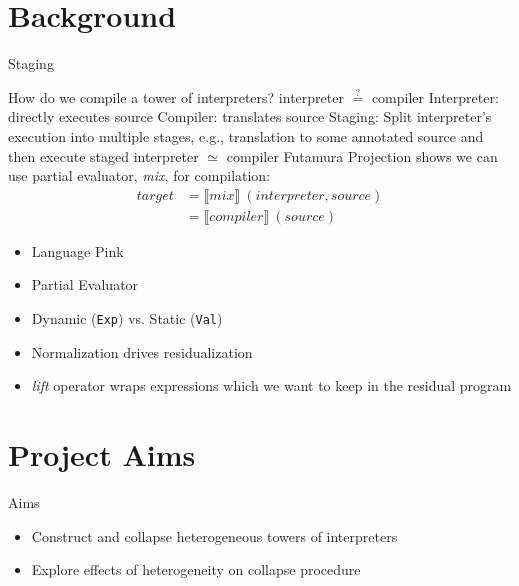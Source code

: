 \documentclass{beamer}
\begin{document}
\section{Background}
\begin{frame}{Staging}
    \begin{outline}
        \1 How do we compile a tower of interpreters?
        \pause
        \1 interpreter $\stackrel{?}=$ compiler
        \pause
        \1 Interpreter: directly executes source
        \1 Compiler: translates source
        \pause
        \1 Staging: Split interpreter's execution into multiple stages, e.g., translation to some annotated source and then execute
        \pause
        \1 staged interpreter $\simeq$ compiler
        \pause
        \1  Futamura Projection \cite{futamura1999partial} shows we can use partial evaluator, \textit{mix}, for compilation:
                \begin{align*}
                    \mathit{target} & = \llbracket \mathit{mix} \rrbracket \: (\mathit{interpreter, source}) \\
                                    & = \llbracket \mathit{compiler} \rrbracket \: (\mathit{source})
                \end{align*}
    \end{outline}
\end{frame}

\begin{frame}{\texorpdfstring{\mslang}{}}
    \begin{itemize}
        \item Language Pink \cite{amin2017collapsing}
        \item Partial Evaluator
        \item Dynamic (\texttt{Exp}) vs. Static (\texttt{Val})
        \item Normalization drives residualization
        \item \textit{lift} operator wraps expressions which we want to keep in the residual program
    \end{itemize}
\end{frame}

\section{Project Aims}
\begin{frame}{Aims}
    \begin{itemize}
        \item Construct and collapse heterogeneous towers of interpreters
        \item Explore effects of heterogeneity on collapse procedure
    \end{itemize}
\end{frame}
\end{document}
